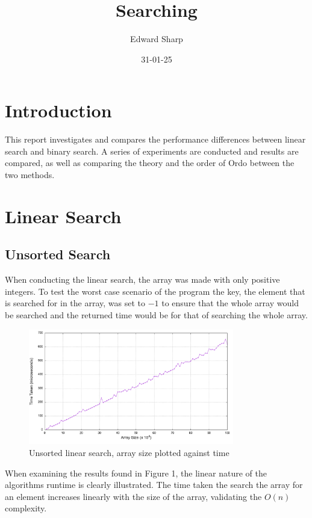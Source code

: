 \documentclass[a4paper,11pt]{article}
\begin{document}
\title{
    \textbf{Searching}
}
\author{Edward Sharp}
\date{31-01-25}

\maketitle

\section*{Introduction}

This report investigates and compares the performance differences between linear search and binary search.
A series of experiments are conducted and results are compared, as well as comparing the theory and the order of Ordo between the two methods.


\section*{Linear Search}
\subsection*{Unsorted Search}
When conducting the linear search, the array was made with only positive integers.
To test the worst case scenario of the program the key, the element that is searched for in the array,
was set to $-1$ to ensure that the whole array would be searched and the returned time would be for that of searching the whole array.

\begin{figure}[h!]
  \centering
  \includegraphics[width=0.8\textwidth]{unsorted_search_plot}
  \caption{Unsorted linear search, array size plotted against time}
  \label{fig:unsorted_search_plot}
\end{figure}

When examining the results found in Figure 1, the linear nature of the algorithms runtime is clearly illustrated.
The time taken the search the array for an element increases linearly with the size of the array, validating the $O(n)$ complexity.
\end{document}
